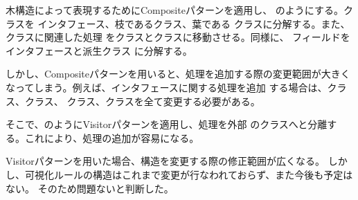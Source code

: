 木構造によって表現するためにCompositeパターン\cite{gof}を適用し、
のようにする。クラスを
インタフェース、枝であるクラス、葉である
クラスに分解する。また、クラスに関連した処理
をクラスとクラスに移動させる。同様に、
フィールドをインタフェースと派生クラス
に分解する。

しかし、Compositeパターンを用いると、処理を追加する際の変更範囲が大きく
なってしまう。例えば、インタフェースに関する処理を追加
する場合は、クラス、クラス、
クラス、クラスを全て変更する必要がある。

そこで、のようにVisitorパターンを適用し、処理を外部
のクラスへと分離する。これにより、処理の追加が容易になる。

Visitorパターンを用いた場合、構造を変更する際の修正範囲が広くなる。
しかし、可視化ルールの構造はこれまで変更が行なわれておらず、また今後も予定はない。
そのため問題ないと判断した。

